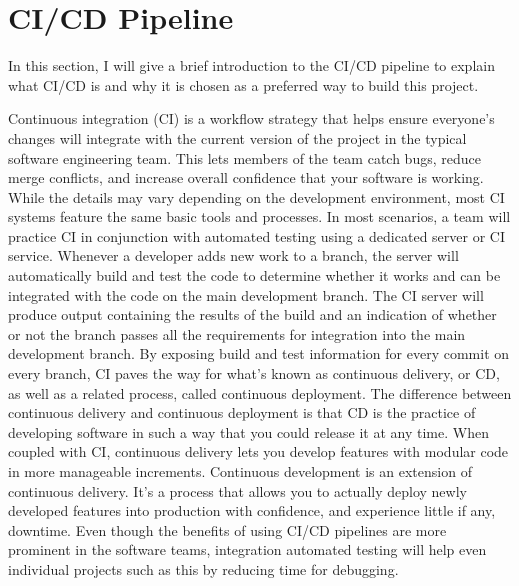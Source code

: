 \section{CI/CD Pipeline} \label{sec:cicd}
In this section, I will give a brief introduction to the CI/CD pipeline to explain what CI/CD is and why it is chosen as a preferred way to build this project.

Continuous integration (CI) is a workflow strategy that helps ensure everyone's changes will integrate with the current version of the project in the typical software engineering team. This lets members of the team catch bugs, reduce merge conflicts, and increase overall confidence that your software is working. While the details may vary depending on the development environment, most CI systems feature the same basic tools and processes. In most scenarios, a team will practice CI in conjunction with automated testing using a dedicated server or CI service. Whenever a developer adds new work to a branch, the server will automatically build and test the code to determine whether it works and can be integrated with the code on the main development branch. The CI server will produce output containing the results of the build and an indication of whether or not the branch passes all the requirements for integration into the main development branch. By exposing build and test information for every commit on every branch, CI paves the way for what's known as continuous delivery, or CD, as well as a related process, called continuous deployment. The difference between continuous delivery and continuous deployment is that CD is the practice of developing software in such a way that you could release it at any time. When coupled with CI, continuous delivery lets you develop features with modular code in more manageable increments. Continuous development is an extension of continuous delivery. It's a process that allows you to actually deploy newly developed features into production with confidence, and experience little if any, downtime. Even though the benefits of using CI/CD pipelines are more prominent in the software teams, integration automated testing will help even individual projects such as this by reducing time for debugging.

